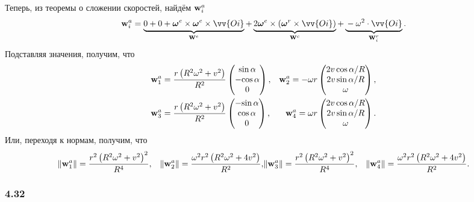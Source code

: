 Теперь, из теоремы о сложении скоростей, найдём $\mbox{\boldmath $\mathrm{w}$}^a_i$
$$
    \vc{\mathrm{w}}^a_i = \underbrace{0 + \vphantom{\left(\vv{Oi}\right)} 0 + \vc{\omega}^e \times \vc{\omega}^e \times \vv{Oi}}_{\vc{\mathrm{w}}^e} + \underbrace{2 \vc{\omega}^e \times \left(
        \vc{\omega}^r \times \vv{Oi}
    \right)}_{\vc{\mathrm{w}}^c} + \underbrace{\vphantom{\left(\vv{Oi}\right)} -\omega^2 \cdot \vv{Oi}}_{\vc{\mathrm{w}}^r_i}.
$$
Подставляя значения, получим, что
\begin{align*}
% 
& \vc{\mathrm{w}}^a_1 = \frac{r \left(R^{2} \omega^{2} + v^{2}\right) }{R^2} 
\left(\begin{matrix}{\sin{\alpha}}\\- { \cos{\alpha}}\\0\end{matrix}\right),
% 
& \vc{\mathrm{w}}^a_2 = - \omega r
\left(\begin{matrix} {2 v \cos{\alpha}}/{R}\\ {2 v \sin{\alpha}}/{R}\\ \omega \end{matrix}\right), \\
% 
& \vc{\mathrm{w}}^a_3 = \frac{r \left(R^{2} \omega^{2} + v^{2}\right) }{R^2} 
\left(\begin{matrix}- { \sin{\alpha}}\\{\cos{\alpha}}\\0\end{matrix}\right),
% 
& \vc{\mathrm{w}}^a_4 = \omega r
\left(\begin{matrix}{2 v \cos{\alpha}}/{R}\\{2 v \sin{\alpha}}/{R}\\\omega \end{matrix}\right).
% 
\end{align*}
Или, переходя к нормам, получим, что
\begin{align*}
    &\|\mbox{\boldmath $\mathrm{w}$}^a_1\|=\frac{r^{2} \left(R^{2} \omega^{2} + v^{2}\right)^{2}}{R^{4}}
    , 
    &\|\mbox{\boldmath $\mathrm{w}$}^a_2\|=\frac{\omega^{2} r^{2} \left(R^{2} \omega^{2} + 4 v^{2}\right)}{R^{2}}
    , 
    &\|\mbox{\boldmath $\mathrm{w}$}^a_3\|=\frac{r^{2} \left(R^{2} \omega^{2} + v^{2}\right)^{2}}{R^{4}}
    , 
    &\|\mbox{\boldmath $\mathrm{w}$}^a_4\|=\frac{\omega^{2} r^{2} \left(R^{2} \omega^{2} + 4 v^{2}\right)}{R^{2}}.
\end{align*}



\subsubsection*{4.32}



